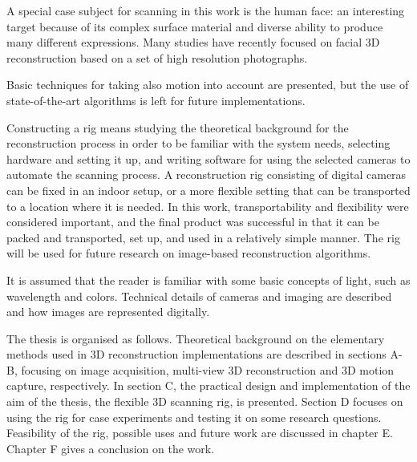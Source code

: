 A special case subject for scanning in this work is the human face: an interesting target because of its complex surface material and diverse ability to produce many different expressions.
Many studies have recently focused on facial 3D reconstruction based on a set of high resolution photographs.


Basic techniques for taking also motion into account are presented, but the use of state-of-the-art algorithms is left for future implementations.


Constructing a rig means studying the theoretical background for the reconstruction process in order to be familiar with the system needs, selecting hardware and setting it up, and writing software for using the selected cameras to automate the scanning process.
A reconstruction rig consisting of digital cameras can be fixed in an indoor setup, or a more flexible setting that can be transported to a location where it is needed.
In this work, transportability and flexibility were considered important, and the final product was successful in that it can be packed and transported, set up, and used in a relatively simple manner.
The rig will be used for future research on image-based reconstruction algorithms.

It is assumed that the reader is familiar with some basic concepts of light, such as wavelength and colors. Technical details of cameras and imaging are described and how images are represented digitally. %

The thesis is organised as follows.
Theoretical background on the elementary methods used in 3D reconstruction implementations are described in sections A-B, focusing on image acquisition, multi-view 3D reconstruction and 3D motion capture, respectively.
In section C, the practical design and implementation of the aim of the thesis, the flexible 3D scanning rig, is presented.
Section D focuses on using the rig for case experiments and testing it on some research questions.
Feasibility of the rig, possible uses and future work are discussed in chapter E.
Chapter F gives a conclusion on the work.
